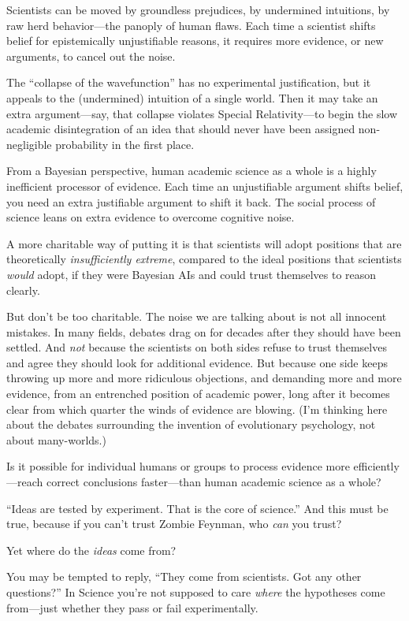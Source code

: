{
 Scientists can be moved by groundless prejudices, by undermined
intuitions, by raw herd behavior---the panoply of human flaws. Each
time a scientist shifts belief for epistemically unjustifiable reasons,
it requires more evidence, or new arguments, to cancel out the noise.}

{
 The ``collapse of the
wavefunction'' has no experimental justification, but
it appeals to the (undermined) intuition of a single world. Then it may
take an extra argument---say, that collapse violates Special
Relativity---to begin the slow academic disintegration of an idea that
should never have been assigned non-negligible probability in the first
place.}

{
 From a Bayesian perspective, human academic science as a whole is
a highly inefficient processor of evidence. Each time an unjustifiable
argument shifts belief, you need an extra justifiable argument to shift
it back. The social process of science leans on extra evidence to
overcome cognitive noise.}

{
 A more charitable way of putting it is that scientists will adopt
positions that are theoretically \textit{insufficiently extreme},
compared to the ideal positions that scientists \textit{would} adopt,
if they were Bayesian AIs and could trust themselves to reason
clearly.}

{
 But don't be too charitable. The noise we are
talking about is not all innocent mistakes. In many fields, debates
drag on for decades after they should have been settled. And
\textit{not} because the scientists on both sides refuse to trust
themselves and agree they should look for additional evidence. But
because one side keeps throwing up more and more ridiculous objections,
and demanding more and more evidence, from an entrenched position of
academic power, long after it becomes clear from which quarter the
winds of evidence are blowing. (I'm thinking here about
the debates surrounding the invention of evolutionary psychology, not
about many-worlds.)}

{
 Is it possible for individual humans or groups to process evidence
more efficiently---reach correct conclusions faster---than human
academic science as a whole?}

{
 ``Ideas are tested by experiment. That is the
core of science.'' And this must be true, because if
you can't trust Zombie Feynman, who \textit{can} you
trust?}

{
 Yet where do the \textit{ideas} come from?}

{
 You may be tempted to reply, ``They come from
scientists. Got any other questions?'' In Science
you're not supposed to care \textit{where} the
hypotheses come from---just whether they pass or fail experimentally.}

